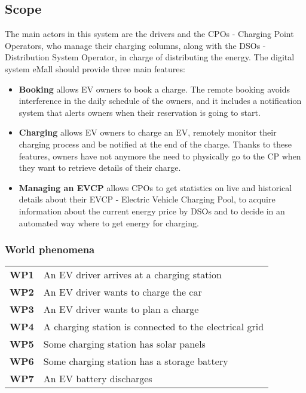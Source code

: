 \subsection{Scope}
The main actors in this system are the drivers and the CPOs - Charging Point Operators, who manage their charging columns, along with the DSOs - Distribution System Operator, in charge of distributing the energy.
The digital system eMall should provide three main features:    
\begin{itemize}
    \item \textbf{Booking} allows EV owners to book a charge. The remote booking avoids interference
          in the daily schedule of the owners, and it includes a notification
          system that alerts owners when their reservation is going to start.
    \item \textbf{Charging} allows EV owners to charge an EV, remotely monitor their charging
          process and be notified at the end of the charge.
          Thanks to these features, owners have not anymore the need to
          physically go to the CP when they want to retrieve details of their charge.
    \item  \textbf{Managing an EVCP} allows CPOs to get statistics on live and historical details
          about their EVCP - Electric Vehicle Charging Pool, to acquire information about the current energy price by
          DSOs and to decide in an automated way where to get energy for charging.
\end{itemize}




\subsubsection{World phenomena}
\begin{table}[H]
    \begin{tabularx}{\textwidth}{cX}
        \toprule
        \textbf{WP1} & An EV driver arrives at a charging station             \\
        \textbf{WP2} & An EV driver wants to charge the car                   \\
        \textbf{WP3} & An EV driver wants to plan a charge                    \\
        \textbf{WP4} & A charging station is connected to the electrical grid \\
        \textbf{WP5} & Some charging station has solar panels                 \\
        \textbf{WP6} & Some charging station has a storage battery            \\
        \textbf{WP7} & An EV battery discharges                               \\ \bottomrule
    \end{tabularx}
\end{table}
